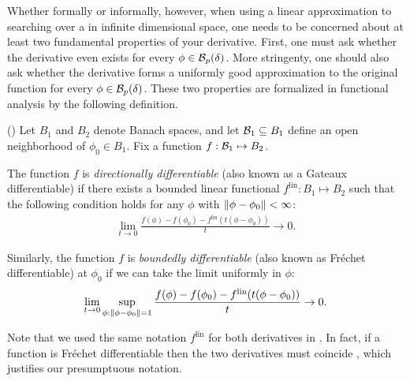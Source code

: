 Whether formally or informally, however, when using a linear approximation to
searching over a in infinite dimensional space, one needs to be concerned about
at least two fundamental properties of your derivative.  First, one must ask
whether the derivative even exists for every $\phi \in \mathcal{B}_p(\delta)$. More
stringenty, one should also ask whether the derivative forms a uniformly good
approximation to the original function for every $\phi \in \mathcal{B}_p(\delta)$.
These two properties are formalized in functional analysis by the following
definition.

\begin{defn}
    (\citep[Definition 4.5]{zeidler:2013:functional})
%
Let $B_1$ and $B_2$ denote Banach spaces, and let $\mathcal{B}_1 \subseteq B_1$ define
an open neighborhood of $\phi_0 \in B_1$.  Fix a function $f: \mathcal{B}_1
\mapsto B_2$.

The function $f$ is {\em directionally differentiable} (also known as a Gateaux
differentiable) if there exists a bounded linear functional $f^{\mathrm{lin}}:
B_1 \mapsto B_2$ such that the following condition holds for any
$\phi$ with $\left\Vert\phi - \phi_0\right\Vert < \infty$:
%
\begin{align*}
%
\lim_{t \rightarrow 0}
    \frac{f(\phi) - f(\phi_0) -
          f^{\mathrm{lin}}(t (\phi - \phi_0) )
         }{t} \rightarrow 0.
%
\end{align*}
%

Similarly, the function $f$ is {\em boundedly differentiable} (also known as
Fr{\'echet} differentiable) at $\phi_0$ if we can take the limit uniformly in
$\phi$:
%
\begin{align*}
%
\lim_{t \rightarrow 0}
    \sup_{\phi: \norm{\phi - \phi_0} = 1}
    \frac{f(\phi) - f(\phi_0) -
          f^{\mathrm{lin}}(t (\phi - \phi_0))
         }{t} \rightarrow 0.
%
\end{align*}
%
\end{defn}

Note that we used the same notation $f^{\mathrm{lin}}$ for both derivatives in
.  In fact, if a function is Fr{\'e}chet differentiable
then the two derivatives must coincide \citep[Proposition
4.8]{zeidler:2013:functional}, which justifies our presumptuous notation.

